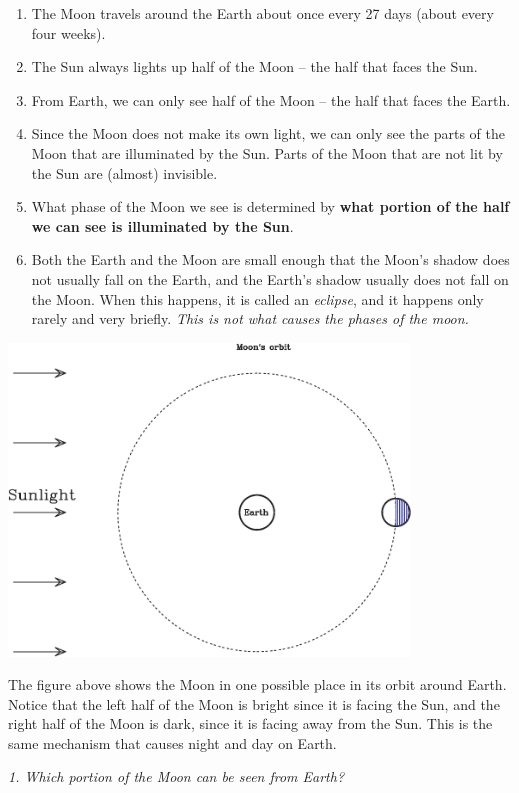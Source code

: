 \documentclass[11pt]{article}
\begin{document}
\begin{enumerate}
\item The Moon travels around the Earth about once every 27 days (about every four weeks).
\item The Sun always lights up half of the Moon -- the half that faces the Sun.
\item From Earth, we can only see half of the Moon -- the half that faces the Earth.
\item Since the Moon does not make its own light, we can only see the parts of the Moon that are illuminated by the Sun. Parts of the Moon that are not lit by the Sun are (almost) invisible.
\item What phase of the Moon we see is determined by {\bf what portion of the half we can see is illuminated by the Sun}.
\item Both the Earth and the Moon are small enough that the Moon's shadow does not usually fall on the Earth, and the Earth's
shadow usually does not fall on the Moon. When this happens, it is called an {\it eclipse}, and it happens only rarely and very 
briefly. {\it This is not what causes the phases of the moon.}
\end{enumerate}

\newpage
\includegraphics[width=0.8\textwidth]{moon-diagram-full.pdf}


	The figure above shows the Moon in one possible place in its orbit around Earth. Notice that the left half of the Moon is
	bright since it is facing the Sun, and the right half of the Moon is dark, since it is facing away from the Sun. This is the same mechanism that causes night and day on Earth.

{\it 1. Which portion of the Moon can be seen from Earth? }
\end{document}
